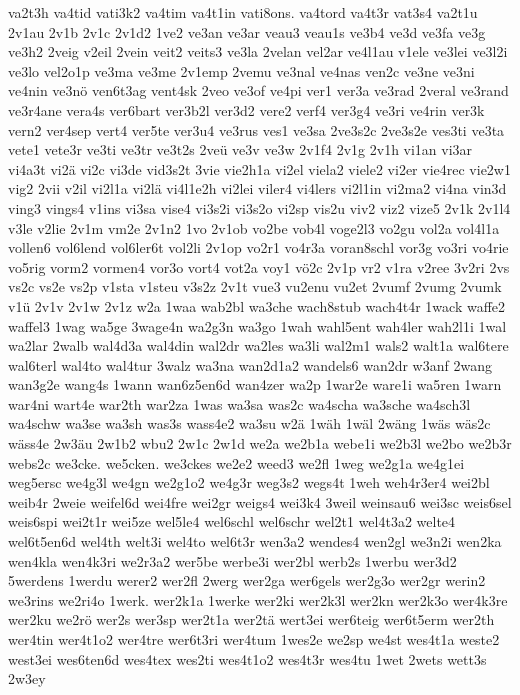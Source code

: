 {va2t3h
va4tid
vati3k2
va4tim
va4t1in
vati8ons.
va4tord
va4t3r
vat3s4
va2t1u
2v1au
2v1b
2v1c
2v1d2
1ve2
ve3an
ve3ar
veau3
veau1s
ve3b4
ve3d
ve3fa
ve3g
ve3h2
2veig
v2eil
2vein
veit2
veits3
ve3la
2velan
vel2ar
ve4l1au
v1ele
ve3lei
ve3l2i
ve3lo
vel2o1p
ve3ma
ve3me
2v1emp
2vemu
ve3nal
ve4nas
ven2c
ve3ne
ve3ni
ve4nin
ve3nö
ven6t3ag
vent4sk
2veo
ve3of
ve4pi
ver1
ver3a
ve3rad
2veral
ve3rand
ve3r4ane
vera4s
ver6bart
ver3b2l
ver3d2
vere2
verf4
ver3g4
ve3ri
ve4rin
ver3k
vern2
ver4sep
vert4
ver5te
ver3u4
ve3rus
ves1
ve3sa
2ve3s2c
2ve3s2e
ves3ti
ve3ta
vete1
vete3r
ve3ti
ve3tr
ve3t2s
2veü
ve3v
ve3w
2v1f4
2v1g
2v1h
vi1an
vi3ar
vi4a3t
vi2ä
vi2c
vi3de
vid3s2t
3vie
vie2h1a
vi2el
viela2
viele2
vi2er
vie4rec
vie2w1
vig2
2vii
v2il
vi2l1a
vi2lä
vi4l1e2h
vi2lei
viler4
vi4lers
vi2l1in
vi2ma2
vi4na
vin3d
ving3
vings4
v1ins
vi3sa
vise4
vi3s2i
vi3s2o
vi2sp
vis2u
viv2
viz2
vize5
2v1k
2v1l4
v3le
v2lie
2v1m
vm2e
2v1n2
1vo
2v1ob
vo2be
vob4l
voge2l3
vo2gu
vol2a
vol4l1a
vollen6
vol6lend
vol6ler6t
vol2li
2v1op
vo2r1
vo4r3a
voran8schl
vor3g
vo3ri
vo4rie
vo5rig
vorm2
vormen4
vor3o
vort4
vot2a
voy1
vö2c
2v1p
vr2
v1ra
v2ree
3v2ri
2vs
vs2c
vs2e
vs2p
v1sta
v1steu
v3s2z
2v1t
vue3
vu2enu
vu2et
2vumf
2vumg
2vumk
v1ü
2v1v
2v1w
2v1z
w2a
1waa
wab2bl
wa3che
wach8stub
wach4t4r
1wack
waffe2
waffel3
1wag
wa5ge
3wage4n
wa2g3n
wa3go
1wah
wahl5ent
wah4ler
wah2l1i
1wal
wa2lar
2walb
wal4d3a
wal4din
wal2dr
wa2les
wa3li
wal2m1
wals2
walt1a
wal6tere
wal6terl
wal4to
wal4tur
3walz
wa3na
wan2d1a2
wandels6
wan2dr
w3anf
2wang
wan3g2e
wang4s
1wann
wan6z5en6d
wan4zer
wa2p
1war2e
ware1i
wa5ren
1warn
war4ni
wart4e
war2th
war2za
1was
wa3sa
was2c
wa4scha
wa3sche
wa4sch3l
wa4schw
wa3se
wa3sh
was3s
wass4e2
wa3su
w2ä
1wäh
1wäl
2wäng
1wäs
wäs2c
wäss4e
2w3äu
2w1b2
wbu2
2w1c
2w1d
we2a
we2b1a
webe1i
we2b3l
we2bo
we2b3r
webs2c
we3cke.
we5cken.
we3ckes
we2e2
weed3
we2fl
1weg
we2g1a
we4g1ei
weg5ersc
we4g3l
we4gn
we2g1o2
we4g3r
weg3s2
wegs4t
1weh
weh4r3er4
wei2bl
weib4r
2weie
weifel6d
wei4fre
wei2gr
weigs4
wei3k4
3weil
weinsau6
wei3sc
weis6sel
weis6spi
wei2t1r
wei5ze
wel5le4
wel6schl
wel6schr
wel2t1
wel4t3a2
welte4
wel6t5en6d
wel4th
welt3i
wel4to
wel6t3r
wen3a2
wendes4
wen2gl
we3n2i
wen2ka
wen4kla
wen4k3ri
we2r3a2
wer5be
werbe3i
wer2bl
werb2s
1werbu
wer3d2
5werdens
1werdu
werer2
wer2fl
2werg
wer2ga
wer6gels
wer2g3o
wer2gr
werin2
we3rins
we2ri4o
1werk.
wer2k1a
1werke
wer2ki
wer2k3l
wer2kn
wer2k3o
wer4k3re
wer2ku
we2rö
wer2s
wer3sp
wer2t1a
wer2tä
wert3ei
wer6teig
wer6t5erm
wer2th
wer4tin
wer4t1o2
wer4tre
wer6t3ri
wer4tum
1wes2e
we2sp
we4st
wes4t1a
weste2
west3ei
wes6ten6d
wes4tex
wes2ti
wes4t1o2
wes4t3r
wes4tu
1wet
2wets
wett3s
2w3ey
}
